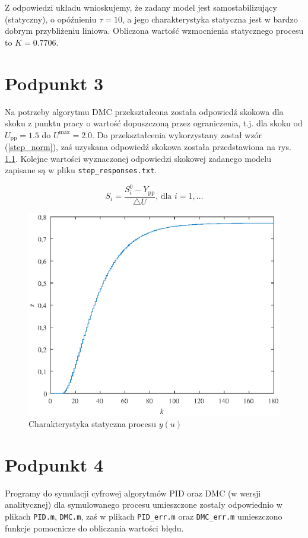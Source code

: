 Z odpowiedzi układu wnioskujemy, że zadany model jest samostabilizujący (statyczny), o opóźnieniu $\tau =10$, a jego charakterystyka statyczna jest w bardzo dobrym przybliżeniu liniowa. Obliczona wartość wzmocnienia statycznego procesu to $K=\num{0,7706}$.


\chapter{Podpunkt 3}
Na potrzeby algorytmu DMC przekształcona została odpowiedź skokowa dla skoku z punktu pracy o wartość dopuszczoną przez ograniczenia, t.j. dla skoku od $U_{\mathrm{pp}}=\num{1,5}$ do $U^{\mathrm{max}}=\num{2,0}$. Do przekształcenia wykorzystany został wzór (\ref{step_norm}), zaś uzyskana odpowiedź skokowa została przedstawiona na rys. \ref{Z3step}. Kolejne wartości wyznaczonej odpowiedzi skokowej zadanego modelu zapisane są w pliku \verb+step_responses.txt+.

\begin{equation}
S_i = \frac{S_i^0 - Y_{\mathrm{pp}}}{\triangle U} \textrm{, dla } i=1,\ldots
\label{step_norm}
\end{equation}


\begin{figure}[ht]
\centering
\includegraphics[scale=1]{images/Z3step}
\caption{Charakterystyka statyczna procesu $y(u)$}
\label{Z3step}
\end{figure}


\chapter{Podpunkt 4}
Programy do symulacji cyfrowej algorytmów PID oraz DMC (w wersji analitycznej) dla symulowanego procesu umieszczone zostały odpowiednio w plikach \verb+PID.m+, \verb+DMC.m+, zaś w plikach \verb+PID_err.m+ oraz \verb+DMC_err.m+ umieszczono funkcje pomocnicze do obliczania wartości błędu.

